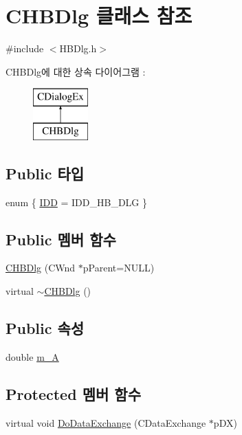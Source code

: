 \hypertarget{class_c_h_b_dlg}{\section{C\-H\-B\-Dlg 클래스 참조}
\label{class_c_h_b_dlg}
}


{\ttfamily \#include $<$H\-B\-Dlg.\-h$>$}

C\-H\-B\-Dlg에 대한 상속 다이어그램 \-: \begin{figure}[H]
\begin{center}
\leavevmode
\includegraphics[height=2.000000cm]{class_c_h_b_dlg}
\end{center}
\end{figure}
\subsection*{Public 타입}
\begin{DoxyCompactItemize}
\item 
enum \{ \hyperlink{class_c_h_b_dlg_a85c548c902dee40ffff4a0ab6abf026ea551e8b24bba5583d8430cdec070fdd90}{I\-D\-D} = I\-D\-D\-\_\-\-H\-B\-\_\-\-D\-L\-G
 \}
\end{DoxyCompactItemize}
\subsection*{Public 멤버 함수}
\begin{DoxyCompactItemize}
\item 
\hyperlink{class_c_h_b_dlg_ad1ad2d7431f683474b3e674a758e45cf}{C\-H\-B\-Dlg} (C\-Wnd $\ast$p\-Parent=N\-U\-L\-L)
\item 
virtual \hyperlink{class_c_h_b_dlg_aa6fa7e090e4b39b162e071867acad12e}{$\sim$\-C\-H\-B\-Dlg} ()
\end{DoxyCompactItemize}
\subsection*{Public 속성}
\begin{DoxyCompactItemize}
\item 
double \hyperlink{class_c_h_b_dlg_a9df17f6054e5bd5e4acfabe606fc12b3}{m\-\_\-\-A}
\end{DoxyCompactItemize}
\subsection*{Protected 멤버 함수}
\begin{DoxyCompactItemize}
\item 
virtual void \hyperlink{class_c_h_b_dlg_a4a5143405ebecad3bbc6e32dcc0b0f9b}{Do\-Data\-Exchange} (C\-Data\-Exchange $\ast$p\-D\-X)
\end{DoxyCompactItemize}



